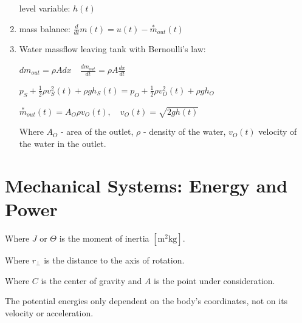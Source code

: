 \documentclass[10pt,a4paper]{scrartcl}
\begin{document}
\begin{multicols*}{3}
\begin{enumerate}
level variable: $h(t)$
\item mass balance: $\frac{d}{dt}m(t)=u(t)-\overset{\ast}{m}_{out}(t)$
\item Water massflow leaving tank with Bernoulli's law:

$dm_{out}=\rho A dx\quad \frac{dm_{out}}{dt}=\rho A \frac{dx}{dt}$

$p_S+\frac{1}{2}\rho v_S^2(t)+\rho gh_S(t)=p_O+\frac{1}{2}\rho v_O^2(t)+\rho g h_O$

$\overset{\ast}{m}_{out}(t)=A_O\rho v_O(t),\quad v_O(t)=\sqrt{2gh(t)}$

Where $A_O$ - area of the outlet, $\rho$ - density of the water, $v_O(t)$ velocity of the water in the outlet.
\end{enumerate}

\vfill
\null
\newpage

\section{Mechanical Systems: Energy and Power}



Where $J$ or $\Theta$ is the moment of inertia $[\si{\meter\squared\kilogram}]$.



Where $r_\perp$ is the distance to the axis of rotation.


Where $C$ is the center of gravity and $A$ is the point under consideration.




The potential energies only dependent on the body's coordinates, not on its velocity or acceleration.


\end{multicols*}
\end{document}
